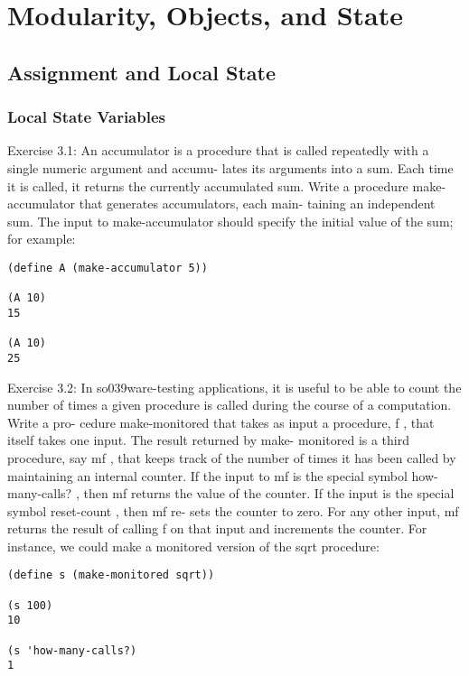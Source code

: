 %

    \section{Modularity, Objects, and State}
        \subsection{Assignment and Local State}
            \subsubsection{Local State Variables}

Exercise 3.1: An accumulator is a procedure that is called repeatedly with a single numeric argument and accumu- lates its arguments into a sum.  Each time it is called, it returns the currently accumulated sum. Write a procedure make-accumulator that generates accumulators, each main- taining an independent sum. The input to make-accumulator should specify the initial value of the sum; for example:
\begin{verbatim}
(define A (make-accumulator 5))

(A 10)
15

(A 10)
25
\end{verbatim}

Exercise 3.2: In so\ue039ware-testing applications, it is useful to be able to count the number of times a given procedure is called during the course of a computation. Write a pro- cedure make-monitored that takes as input a procedure, f , that itself takes one input. The result returned by make- monitored is a third procedure, say mf , that keeps track of the number of times it has been called by maintaining an internal counter. If the input to mf is the special symbol how-many-calls? , then mf returns the value of the counter.  If the input is the special symbol reset-count , then mf re- sets the counter to zero. For any other input, mf returns the result of calling f on that input and increments the counter.  For instance, we could make a monitored version of the sqrt procedure:

\begin{verbatim}
(define s (make-monitored sqrt))

(s 100)
10

(s 'how-many-calls?)
1
\end{verbatim}

